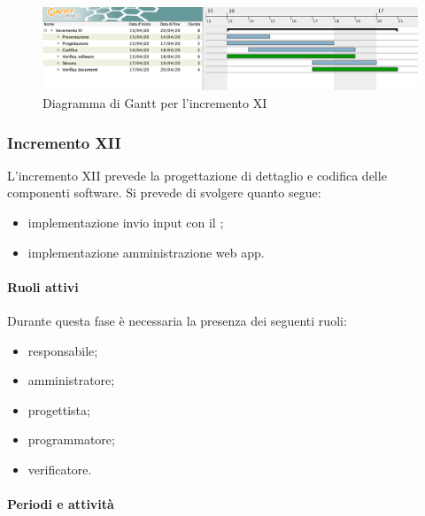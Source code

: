 		\begin{landscape}
          \begin{figure}[H]
            \centering
            \includegraphics[width=\linewidth]{images/gantt/incrementoXI} %
            \caption{Diagramma di Gantt per l'incremento XI}
          \end{figure}		
		\end{landscape}


		\subsubsection{Incremento XII}
			
			L'incremento XII prevede la progettazione di dettaglio e codifica delle componenti software. Si prevede di svolgere quanto segue:
			\begin{itemize}
				\item implementazione invio input con il ;
				\item implementazione amministrazione web app.
			\end{itemize}
			
			\paragraph{Ruoli attivi}
			
				Durante questa fase è necessaria la presenza dei seguenti ruoli:
				\begin{itemize}
					\item responsabile;
					\item amministratore;
					\item progettista;
					\item programmatore;
					\item verificatore.
				\end{itemize}
			
			\paragraph{Periodi e attività}
			
